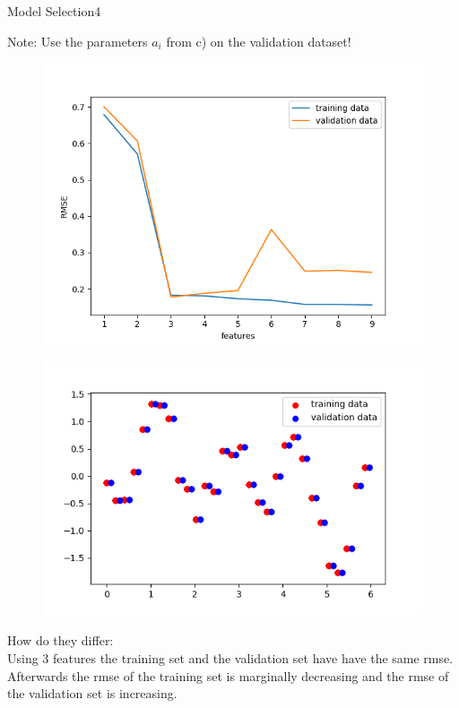 \begin{questions}
\begin{question}{Model Selection}{4}
	\begin{answer}
	Note: Use the parameters $a_i$ from c) on the validation dataset!
\begin{figure}[H]
	\centering
	\begin{minipage}{.5\textwidth}
		\centering
		\includegraphics[width=1\textwidth]{img/3e.png} 
		\label{fig:test1}
	\end{minipage}%
	\begin{minipage}{.5\textwidth}
		\centering
		\includegraphics[width=1\textwidth]{img/data.png} 
		\label{fig:test2}
	\end{minipage}
\end{figure}

	
	How do they differ:\\
	Using 3 features the training set and the validation set have have the same rmse. Afterwards the rmse of the training set is marginally decreasing and the rmse of the validation set is increasing. 
	

\end{answer}
\end{question}
\end{questions}
